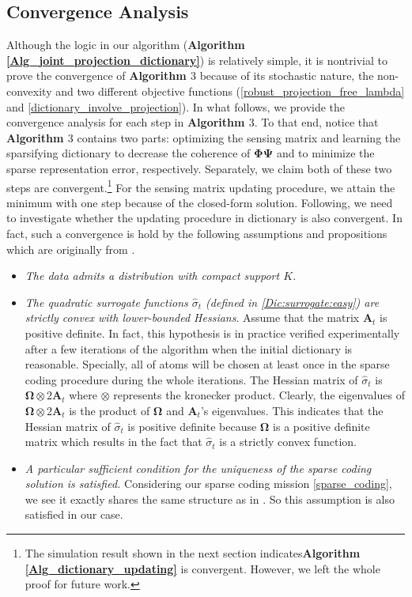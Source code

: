 \documentclass[final,5p,times,twocolumn]{elsarticle}
\begin{document}
\subsection{Convergence Analysis}
Although the logic in our algorithm ({\bf Algorithm \ref{Alg_joint_projection_dictionary}}) is relatively simple, it is nontrivial to prove the convergence of {\bf Algorithm $3$} because of its stochastic nature, the non-convexity and two different objective functions (\eqref{robust_projection_free_lambda} and \eqref{dictionary_involve_projection}). In what follows, we provide the convergence analysis for each step in {\bf Algorithm $3$}. To that end, notice that {\bf Algorithm $3$} contains two parts: optimizing the sensing matrix and learning the sparsifying dictionary to decrease the coherence of $\bm\Phi\bm\Psi$ and to minimize the sparse representation error, respectively. Separately, we claim both of these two steps are convergent.\footnote{The simulation result shown in the next section indicates{\bf Algorithm \ref{Alg_dictionary_updating}} is convergent. However, we left the whole proof for future work.} For the sensing matrix updating procedure, we attain the minimum with one step because of the closed-form solution. Following, we need to investigate whether the updating procedure in dictionary is also convergent. In fact, such a convergence is hold by the following assumptions and propositions which are originally from \cite{MBPS09,MBPS10}.\\[2pt]
\vspace{-6pt}
\begin{itemize}
	\item[(1).] {\emph {The data admits a distribution with compact support $K$.}}
	\vspace{-0.25cm}
	\item[(2).] {\emph{The quadratic surrogate functions $ \hat \sigma_t$ (defined in \eqref{Dic:surrogate:easy}) are strictly convex with lower-bounded Hessians}}. Assume that the matrix $\bm A_t$ is positive definite. In fact, this hypothesis is in practice verified experimentally after a few iterations of the algorithm when the initial dictionary is reasonable. Specially, all of atoms will be chosen at least once in the sparse coding procedure during the whole iterations. The Hessian matrix of $\hat \sigma_t$ is $\bm \Omega \otimes 2\bm A_t$ where $\otimes$ represents the kronecker product. Clearly, the eigenvalues of  $\bm \Omega \otimes 2\bm A_t$ is the product of $\bm \Omega$ and $\bm A_t$'s eigenvalues. This indicates that the Hessian matrix of $\hat \sigma_t$ is positive definite because $\bm \Omega$ is a positive definite matrix which results in the fact that $ \hat \sigma_t$ is a strictly convex function.
\vspace{-0.25cm}
	\item[(3).]  {\emph{A particular sufficient condition for the uniqueness of the sparse coding solution is satisfied.}} Considering our sparse coding mission \eqref{sparse_coding}, we see it exactly shares the same structure as in \cite{MBPS09,MBPS10}. So this assumption is also satisfied in our case.
\end{itemize}
\end{document}
